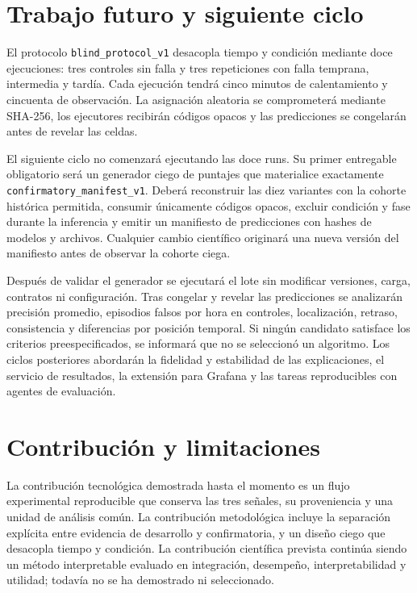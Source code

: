 \documentclass[conference]{IEEEtran}
\begin{document}
\section{Trabajo futuro y siguiente ciclo}

El protocolo \texttt{blind\_protocol\_v1} desacopla tiempo y condición mediante doce ejecuciones: tres controles sin falla y tres repeticiones con falla temprana, intermedia y tardía. Cada ejecución tendrá cinco minutos de calentamiento y cincuenta de observación. La asignación aleatoria se comprometerá mediante SHA-256, los ejecutores recibirán códigos opacos y las predicciones se congelarán antes de revelar las celdas.

El siguiente ciclo no comenzará ejecutando las doce runs. Su primer entregable obligatorio será un generador ciego de puntajes que materialice exactamente \texttt{confirmatory\_manifest\_v1}. Deberá reconstruir las diez variantes con la cohorte histórica permitida, consumir únicamente códigos opacos, excluir condición y fase durante la inferencia y emitir un manifiesto de predicciones con hashes de modelos y archivos. Cualquier cambio científico originará una nueva versión del manifiesto antes de observar la cohorte ciega.

Después de validar el generador se ejecutará el lote sin modificar versiones, carga, contratos ni configuración. Tras congelar y revelar las predicciones se analizarán precisión promedio, episodios falsos por hora en controles, localización, retraso, consistencia y diferencias por posición temporal. Si ningún candidato satisface los criterios preespecificados, se informará que no se seleccionó un algoritmo. Los ciclos posteriores abordarán la fidelidad y estabilidad de las explicaciones, el servicio de resultados, la extensión para Grafana y las tareas reproducibles con agentes de evaluación.

\section{Contribución y limitaciones}

La contribución tecnológica demostrada hasta el momento es un flujo experimental reproducible que conserva las tres señales, su proveniencia y una unidad de análisis común. La contribución metodológica incluye la separación explícita entre evidencia de desarrollo y confirmatoria, y un diseño ciego que desacopla tiempo y condición. La contribución científica prevista continúa siendo un método interpretable evaluado en integración, desempeño, interpretabilidad y utilidad; todavía no se ha demostrado ni seleccionado.
\end{document}

